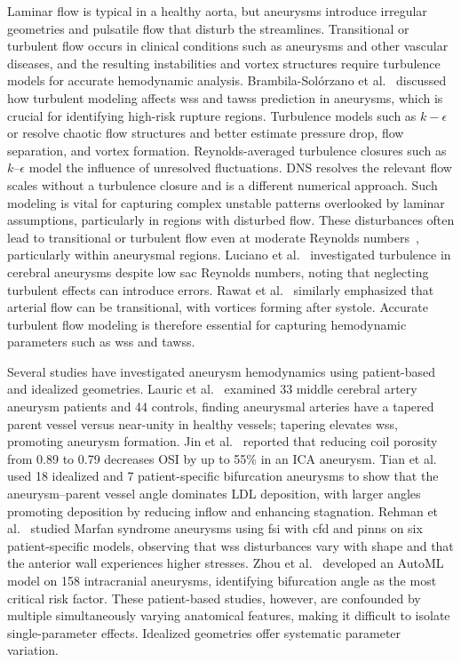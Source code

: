 \documentclass[12pt,a4paper]{article}
\newcommand{\cfdrevision}[1]{#1} %
\newcommand{\CFD}{\ac{cfd}\xspace}
\newcommand{\FSI}{\ac{fsi}\xspace}
\newcommand{\PINNs}{\acp{pinn}\xspace}
\newcommand{\WSS}{\ac{wss}\xspace}
\newcommand{\TAWSS}{\ac{tawss}\xspace}
\newcommand{\OSI}{\ac{OSI}\xspace}
\newcommand{\ICA}{\ac{ICA}\xspace}
\newcommand{\DNS}{\ac{DNS}\xspace}
\newcommand{\LDL}{\ac{LDL}\xspace}
\theoremstyle{definition}
\numberwithin{equation}{section}
\providecommand{\DIFaddtex}[1]{{\protect\color{blue} \sf #1}} %
\providecommand{\DIFdeltex}[1]{{\protect\color{red} \scriptsize #1}} %
\providecommand{\DIFaddbegin}{} %
\providecommand{\DIFaddend}{} %
\providecommand{\DIFdelbegin}{} %
\providecommand{\DIFdelend}{} %
\providecommand{\DIFadd}[1]{\texorpdfstring{\DIFaddtex{#1}}{#1}} %
\providecommand{\DIFdel}[1]{\texorpdfstring{\DIFdeltex{#1}}{}} %
\newcommand{\DIFscaledelfig}{0.5}
\newlength{\DIFdelgraphicswidth} %
\newlength{\DIFdelgraphicsheight} %
\newcommand{\DIFaddincludegraphics}[2][]{{\color{blue}\fbox{\DIFOincludegraphics[#1]{#2}}}} %
\newcommand{\DIFdelincludegraphics}[2][]{%
\sbox{\DIFdelgraphicsbox}{\DIFOincludegraphics[#1]{#2}}%
\settoboxwidth{\DIFdelgraphicswidth}{\DIFdelgraphicsbox} %
\settoboxtotalheight{\DIFdelgraphicsheight}{\DIFdelgraphicsbox} %
\scalebox{\DIFscaledelfig}{%
\parbox[b]{\DIFdelgraphicswidth}{\usebox{\DIFdelgraphicsbox}\\[-\baselineskip] \rule{\DIFdelgraphicswidth}{0em}}\llap{\resizebox{\DIFdelgraphicswidth}{\DIFdelgraphicsheight}{%
\setlength{\unitlength}{\DIFdelgraphicswidth}%
\begin{picture}(1,1)%
\thicklines\linethickness{2pt} %
{\color[rgb]{1,0,0}\put(0,0){\framebox(1,1){}}}%
{\color[rgb]{1,0,0}\put(0,0){\line( 1,1){1}}}%
{\color[rgb]{1,0,0}\put(0,1){\line(1,-1){1}}}%
\end{picture}%
}\hspace*{3pt}}} %
} %
\DeclareRobustCommand{\DIFaddbegin}{\DIFOaddbegin \let\includegraphics\DIFaddincludegraphics} %
\DeclareRobustCommand{\DIFaddend}{\DIFOaddend \let\includegraphics\DIFOincludegraphics} %
\DeclareRobustCommand{\DIFdelbegin}{\DIFOdelbegin \let\includegraphics\DIFdelincludegraphics} %
\DeclareRobustCommand{\DIFdelend}{\DIFOaddend \let\includegraphics\DIFOincludegraphics} %
\begin{document}
Laminar flow is typical in a healthy aorta, but aneurysms introduce irregular geometries and pulsatile flow that disturb the streamlines. Transitional or turbulent flow occurs in clinical conditions such as aneurysms and other vascular diseases, and the resulting instabilities and vortex structures require turbulence models for accurate hemodynamic analysis. Brambila-Solórzano et al.~\cite{brambila2023influence} discussed how turbulent modeling affects \WSS and \TAWSS prediction in aneurysms, which is crucial for identifying high-risk rupture regions. \DIFdelbegin \DIFdel{Turbulence models such as $k-\epsilon$ or }%
\DIFdel{resolve chaotic flow structures and better estimate pressure drop, flow separation, and vortex formation. }\DIFdelend \DIFaddbegin \DIFadd{\cfdrevision{Reynolds-averaged turbulence closures such as $k$--$\epsilon$ model the influence of unresolved fluctuations. \DNS resolves the relevant flow scales without a turbulence closure and is a different numerical approach.} }\DIFaddend Such modeling is vital for capturing complex unstable patterns overlooked by laminar assumptions, particularly in regions with disturbed flow. These disturbances often lead to transitional or turbulent flow even at moderate Reynolds numbers~\cite{evju2015assumption}, particularly within aneurysmal regions. Luciano et al.~\cite{luciano2024turbulent} investigated turbulence in cerebral aneurysms despite low sac Reynolds numbers, noting that neglecting turbulent effects can introduce errors. Rawat et al.~\cite{rawat2019numerical} similarly emphasized that arterial flow can be transitional, with vortices forming after systole. Accurate turbulent flow modeling is therefore essential for capturing hemodynamic parameters such as \WSS and \TAWSS.

Several studies have investigated aneurysm hemodynamics using patient-based and idealized geometries. Lauric et al.~\cite{lauric2019proximal} examined 33 middle cerebral artery aneurysm patients and 44 controls, finding aneurysmal arteries have a tapered parent vessel versus near-unity in healthy vessels; tapering elevates \WSS, promoting aneurysm formation. Jin et al.~\cite{jin2023cfd} reported that reducing coil porosity from 0.89 to 0.79 decreases \OSI by up to 55\% in an \ICA aneurysm. Tian et al.~\cite{tian2023influence} used 18 idealized and 7 patient-specific bifurcation aneurysms to show that the aneurysm--parent vessel angle dominates \LDL deposition, with larger angles promoting deposition by reducing inflow and enhancing stagnation. Rehman et al.~\cite{ur2025fluid} studied Marfan syndrome aneurysms using \FSI with \CFD and \PINNs on six patient-specific models, observing that \WSS disturbances vary with shape and that the anterior wall experiences higher stresses. Zhou et al.~\cite{zhou2026morphological} developed an AutoML model on 158 intracranial aneurysms, identifying bifurcation angle as the most critical risk factor. These patient-based studies, however, are confounded by multiple simultaneously varying anatomical features, making it difficult to isolate single-parameter effects. Idealized geometries offer systematic parameter variation.
\end{document}
